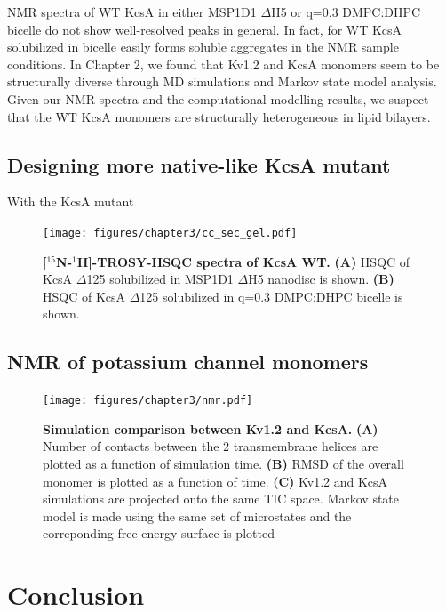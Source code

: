 NMR spectra of WT KcsA in either MSP1D1 $\Delta$H5 or q=0.3 DMPC:DHPC bicelle do not show well-resolved peaks in general. In fact, for WT KcsA solubilized in bicelle easily forms soluble aggregates in the NMR sample conditions. In Chapter 2, we found that Kv1.2 and KcsA monomers seem to be structurally diverse through MD simulations and Markov state model analysis. Given our NMR spectra and the computational modelling results, we suspect that the WT KcsA monomers are structurally heterogeneous in lipid bilayers. 

\subsection{Designing more native-like KcsA mutant}

With the KcsA mutant

\begin{figure}[!ht]
\begin{center}
	\texttt{[image: figures/chapter3/cc\_sec\_gel.pdf]}
\end{center}
	\caption{\textbf{[$^{15}$N-$^{1}$H]-TROSY-HSQC spectra of KcsA WT.}  \textbf{(A)} HSQC of KcsA $\Delta$125 solubilized in MSP1D1 $\Delta$H5 nanodisc is shown. \textbf{(B)} HSQC of KcsA $\Delta$125 solubilized in q=0.3 DMPC:DHPC bicelle is shown.}
	\label{fig:ch3_f4}
\end{figure}

\subsection{NMR of potassium channel monomers}

\begin{figure}[!ht]
\begin{center}
	\texttt{[image: figures/chapter3/nmr.pdf]}
\end{center}
	\caption{\textbf{Simulation comparison between Kv1.2 and KcsA.} \textbf{(A)} Number of contacts between the 2 transmembrane helices are plotted as a function of simulation time. \textbf{(B)} RMSD of the overall monomer is plotted as a function of time. \textbf{(C)} Kv1.2 and KcsA simulations are projected onto the same TIC space. Markov state model is made using the same set of microstates and the correponding free energy surface is plotted}
	\label{fig:ch3_f5}
\end{figure}

\section{Conclusion}

\renewcommand\thefigure{\thechapter.\arabic{figure}} 

